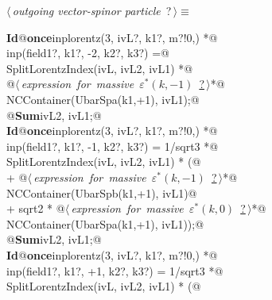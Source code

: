 \documentclass[a4paper,12pt]{amsart}
\renewcommand{\NWtarget}[2]{\hypertarget{#1}{#2}}
\renewcommand{\NWlink}[2]{\hyperlink{#1}{#2}}
\begin{document}
\begin{flushleft} \small
\begin{minipage}{\linewidth}\label{scrap35}\raggedright\small
\NWtarget{nuweb?}{} $\langle\,${\it outgoing vector-spinor particle}\nobreak\ {\footnotesize {?}}$\,\rangle\equiv$
\vspace{-1ex}
\begin{list}{}{} \item
\mbox{}\verb@@\hbox{\sffamily\bfseries Id}\verb@ @\hbox{\sffamily\bfseries once}\verb@ inplorentz(3, ivL?, k1?, m?!{0,}) *@\\
\mbox{}\verb@      inp(field1?, k1?, -2, k2?, k3?) =@\\
\mbox{}\verb@   SplitLorentzIndex(ivL, ivL2, ivL1) *@\\
\mbox{}\verb@   @\hbox{$\langle\,${\it expression for massive $\varepsilon^\ast(k, -1)$}\nobreak\ {\footnotesize \NWlink{nuweb?}{?}}$\,\rangle$}\verb@ *@\\
\mbox{}\verb@   NCContainer(UbarSpa(k1,+1), ivL1);@\\
\mbox{}\verb@   @\hbox{\sffamily\bfseries Sum}\verb@ ivL2, ivL1;@\\
\mbox{}\verb@@\hbox{\sffamily\bfseries Id}\verb@ @\hbox{\sffamily\bfseries once}\verb@ inplorentz(3, ivL?, k1?, m?!{0,}) *@\\
\mbox{}\verb@      inp(field1?, k1?, -1, k2?, k3?) = 1/sqrt3 *@\\
\mbox{}\verb@   SplitLorentzIndex(ivL, ivL2, ivL1) * (@\\
\mbox{}\verb@   + @\hbox{$\langle\,${\it expression for massive $\varepsilon^\ast(k, -1)$}\nobreak\ {\footnotesize \NWlink{nuweb?}{?}}$\,\rangle$}\verb@ *@\\
\mbox{}\verb@     NCContainer(UbarSpb(k1,+1), ivL1)@\\
\mbox{}\verb@   + sqrt2 * @\hbox{$\langle\,${\it expression for massive $\varepsilon^\ast(k, 0)$}\nobreak\ {\footnotesize \NWlink{nuweb?}{?}}$\,\rangle$}\verb@ *@\\
\mbox{}\verb@     NCContainer(UbarSpa(k1,+1), ivL1));@\\
\mbox{}\verb@   @\hbox{\sffamily\bfseries Sum}\verb@ ivL2, ivL1;@\\
\mbox{}\verb@@\hbox{\sffamily\bfseries Id}\verb@ @\hbox{\sffamily\bfseries once}\verb@ inplorentz(3, ivL?, k1?, m?!{0,}) *@\\
\mbox{}\verb@      inp(field1?, k1?, +1, k2?, k3?) = 1/sqrt3 *@\\
\mbox{}\verb@   SplitLorentzIndex(ivL, ivL2, ivL1) * (@\\

\end{list}
\end{minipage}
\end{flushleft}
\end{document}
